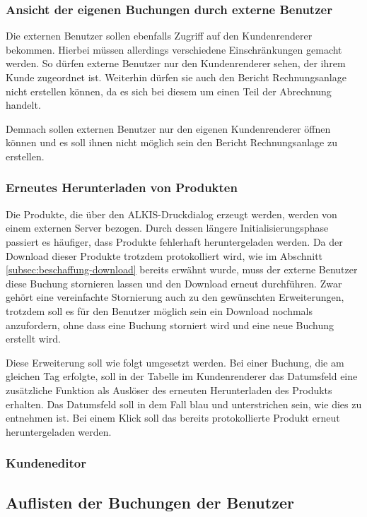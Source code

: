 \subsubsection{Ansicht der eigenen Buchungen durch externe Benutzer}
Die externen Benutzer sollen ebenfalls Zugriff auf den Kundenrenderer bekommen. Hierbei müssen allerdings verschiedene Einschränkungen gemacht werden.
So dürfen externe Benutzer nur den Kundenrenderer sehen, der ihrem Kunde zugeordnet ist. Weiterhin dürfen sie auch den Bericht Rechnungsanlage nicht erstellen können, da es sich bei diesem um einen Teil der Abrechnung handelt.

Demnach sollen externen Benutzer nur den eigenen Kundenrenderer öffnen können und es soll ihnen nicht möglich sein den Bericht Rechnungsanlage zu erstellen.

\subsubsection{Erneutes Herunterladen von Produkten}
Die Produkte, die über den ALKIS-Druckdialog erzeugt werden, werden von einem externen Server bezogen.
Durch dessen längere Initialisierungsphase passiert es häufiger, dass Produkte fehlerhaft heruntergeladen werden.
Da der Download dieser Produkte trotzdem protokolliert wird, wie im Abschnitt \vref{subsec:beschaffung-download} bereits erwähnt wurde, muss der externe Benutzer diese Buchung stornieren lassen und den Download erneut durchführen.
Zwar gehört eine vereinfachte Stornierung auch zu den gewünschten Erweiterungen, trotzdem soll es für den Benutzer möglich sein ein Download nochmals anzufordern, ohne dass eine Buchung storniert wird und eine neue Buchung erstellt wird.

Diese Erweiterung soll wie folgt umgesetzt werden. Bei einer Buchung, die am gleichen Tag erfolgte, soll in der Tabelle im Kundenrenderer das Datumsfeld eine zusätzliche Funktion als Auslöser des  erneuten Herunterladen des Produkts erhalten.
Das Datumsfeld soll in dem Fall blau und unterstrichen sein, wie dies  zu entnehmen ist.
Bei einem Klick soll das bereits protokollierte Produkt erneut heruntergeladen werden.

\subsubsection{Kundeneditor}



\subsection{Auflisten der Buchungen der Benutzer}
